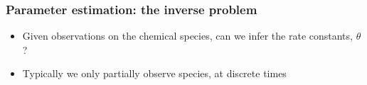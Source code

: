\documentclass[t,compress]{beamer}
\begin{document}
\begin{frame}
\frametitle{Parameter estimation: the inverse problem}

\begin{itemize}
\item Given observations on the chemical species, can we infer the rate
  constants, $\theta$?
\item Typically we only partially observe species, at discrete times
\end{itemize}
\begin{figure}[b]
%
%
%
%
\end{figure}

\end{frame}
\end{document}
